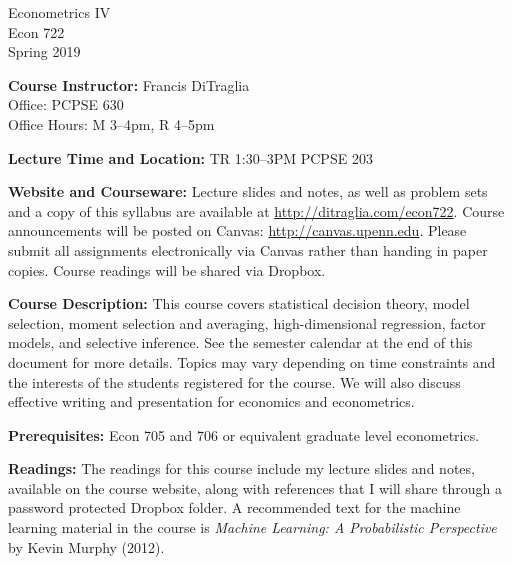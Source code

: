 \documentclass[11pt, letterpaper]{article}
\begin{document}
\thispagestyle{plain}

\begin{center}
\Large
\sc
Econometrics IV\\
\large
Econ 722\\
\large
Spring 2019
\end{center}



\normalsize

\noindent \textbf{Course Instructor:} Francis DiTraglia \\
Office: PCPSE 630\\
Office Hours: M 3--4pm, R 4--5pm 

\medskip

 
\noindent \textbf{Lecture Time and Location:} 
TR 1:30--3PM PCPSE 203

\medskip
 
\noindent \textbf{Website and Courseware:} Lecture slides and notes, as well as problem sets and a copy of this syllabus are available at \url{http://ditraglia.com/econ722}.
Course announcements will be posted on Canvas: \url{http://canvas.upenn.edu}.
Please submit all assignments electronically via Canvas rather than handing in paper copies.
Course readings will be shared via Dropbox.

\medskip



\noindent \textbf{Course Description:} 
This course covers statistical decision theory, model selection, moment selection and averaging, high-dimensional regression, factor models, and selective inference.
See the semester calendar at the end of this document for more details.
Topics may vary depending on time constraints and the interests of the students registered for the course.
We will also discuss effective writing and presentation for economics and econometrics.

\medskip

\noindent \textbf{Prerequisites:} 
Econ 705 and 706 or equivalent graduate level econometrics. 



\medskip

\noindent \textbf{Readings:} 
The readings for this course include my lecture slides and notes, available on the course website, along with references that I will share through a password protected Dropbox folder.
A recommended text for the machine learning material in the course is \emph{Machine Learning: A Probabilistic Perspective} by Kevin Murphy (2012).
\end{document}
